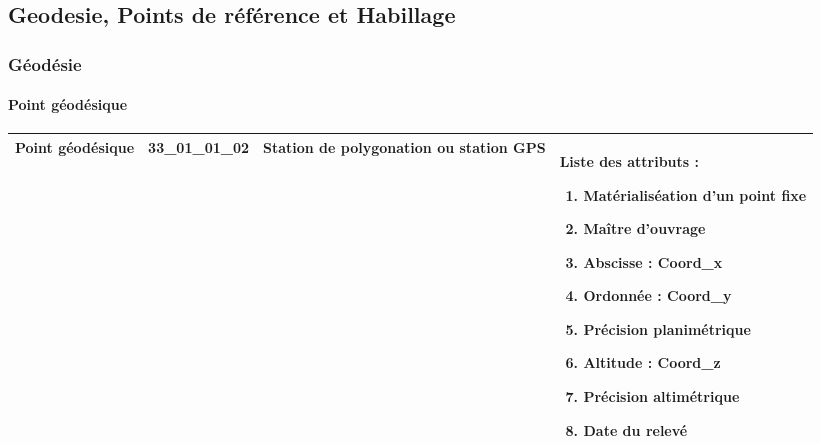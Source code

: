 \documentclass[12pt,titlepage]{book}
\begin{document}
\subsection{Geodesie, Points de référence et Habillage}
\subsubsection{\large Géodésie}
\paragraph{Point géodésique}
\noindent
\vspace{\baselineskip}

\renewcommand{\arraystretch}{1.2}
\begin{supertabular}{|p{10cm}|c|p{13cm}|p{12cm}|}
 Point géodésique & 33\_01\_01\_02 & Station de polygonation ou station GPS & Liste des attributs :
\begin{enumerate}
  \item Matérialiséation d'un point fixe  \item Maître d'ouvrage  \item Abscisse : Coord\_x  \item Ordonnée : Coord\_y  \item Précision planimétrique  \item Altitude : Coord\_z  \item Précision altimétrique  \item Date du relevé\end{enumerate}
\\
\hline
\end{supertabular}
\end{document}
